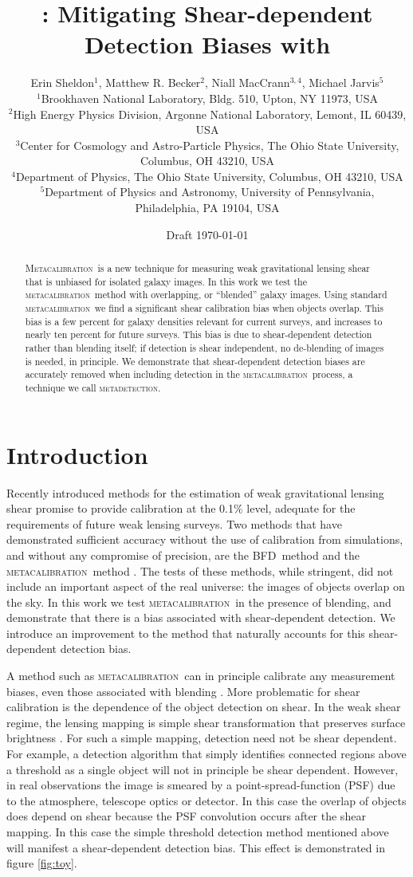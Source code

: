 \documentclass[fleqn,useAMS,usenatbib]{mnras}
\title[\Mdet]{\Mdet: Mitigating Shear-dependent Detection Biases with \Mcal}
\author[Sheldon et~al.]{Erin Sheldon$^1$, Matthew R. Becker$^2$,
Niall MacCrann$^{3,4}$, Michael Jarvis$^5$
  \\$^1$Brookhaven National Laboratory, Bldg. 510, Upton, NY 11973, USA
  \\$^2$High Energy Physics Division, Argonne National Laboratory, Lemont, IL 60439, USA
  \\$^3$Center for Cosmology and Astro-Particle Physics, The Ohio State University, Columbus, OH 43210, USA
  \\$^4$Department of Physics, The Ohio State University, Columbus, OH 43210, USA
  \\$^5$Department of Physics and Astronomy, University of Pennsylvania, Philadelphia, PA 19104, USA
}
\newcommand{\mcal}{\textsc{metacalibration}}
\newcommand{\mdet}{\textsc{metadetection}}
\newcommand{\Mcal}{\textsc{Metacalibration}}
\newcommand{\bfd}{\textsc{BFD}}
\begin{document}
\date{Draft \today}
\maketitle

\begin{abstract}

\Mcal\ is a new technique for measuring weak gravitational lensing shear that
is unbiased for isolated galaxy images.  In this work we test the \mcal\ method
with overlapping, or ``blended'' galaxy images.  Using standard \mcal\ we find
a significant shear calibration bias when objects overlap. This bias is a few
percent for galaxy densities relevant for current surveys, and increases to
nearly ten percent for future surveys.  This bias is due to shear-dependent
detection rather than blending itself; if detection is shear independent, no
de-blending of images is needed, in principle.  We demonstrate that
shear-dependent detection biases are accurately removed when including
detection in the \mcal\ process, a technique we call \mdet.

\end{abstract}

\section{Introduction}


Recently introduced methods for the estimation of weak gravitational lensing
shear promise to provide calibration at the 0.1\% level, adequate for the
requirements of future weak lensing surveys.  Two methods that have
demonstrated sufficient accuracy without the use of calibration from
simulations, and without any compromise of precision, are the \bfd\ method
\citep{BernBFD2016} and the \mcal\ method \citep{HuffMcal2017,SheldonMcal2017}.
The tests of these methods, while stringent, did not include an important
aspect of the real universe: the images of objects overlap on the sky. In this
work we test \mcal\ in the presence of blending, and demonstrate that there is
a bias associated with shear-dependent detection. We introduce an improvement
to the method that naturally accounts for this shear-dependent detection bias.

A method such as \mcal\ can in principle calibrate any measurement biases, even
those associated with blending \citep[e.g.,][]{DawsonBlending2016}. More
problematic for shear calibration is the dependence of the object detection on
shear. In the weak shear regime, the lensing mapping is simple shear
transformation that preserves surface brightness \citep{SchneiderBook92}. For
such a simple mapping, detection need not be shear dependent. For example, a
detection algorithm that simply identifies connected regions above a threshold
as a single object will not in principle be shear dependent. However, in real
observations the image is smeared by a point-spread-function (PSF) due to the
atmosphere, telescope optics or detector. In this case the overlap of objects
does depend on shear because the PSF convolution occurs after the shear mapping.
In this case the simple threshold detection method mentioned above will manifest
a shear-dependent detection bias. This effect is demonstrated in figure
\ref{fig:toy}.
\end{document}
